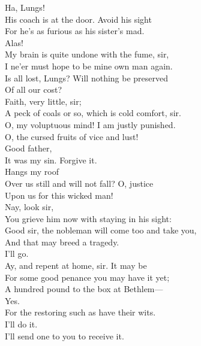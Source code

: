 \documentclass[a4paper,oneside,12pt]{memoir}
\begin{document}
\begin{drama*}
\mammonspeaks {} Ha, Lungs!\\
\facespeaks His coach is at the door. Avoid his sight\\
For he's as furious as his sister's mad.\\
\mammonspeaks Alas!\\
\facespeaks {} My brain is quite undone with the fume, sir,\\
I ne'er must hope to be mine own man again.\\
\mammonspeaks Is all lost, Lungs? Will nothing be preserved\\
Of all our cost?\\
\facespeaks {} Faith, very little, sir;\\
A peck of coals or so, which is cold comfort, sir.\\
\mammonspeaks O, my voluptuous mind! I am justly punished.\\
\subtlespeaks O, the cursed fruits of vice and lust!\\
\mammonspeaks {} Good father,\\
It was my sin. Forgive it.\\
\subtlespeaks {} Hangs my roof\\
Over us still and will not fall? O, justice\\
Upon us for this wicked man!\\
\facespeaks {} Nay, look sir,\\
You grieve him now with staying in his sight:\\
Good sir, the nobleman will come too and take you,\\
And that may breed a tragedy.\\
\mammonspeaks {} I'll go.\\
\facespeaks Ay, and repent at home, sir. It may be\\
For some good penance you may have it yet;\\
A hundred pound to the box at Bethlem---\\
\mammonspeaks Yes.\\
\facespeaks {} For the restoring such as have their wits.\\
\mammonspeaks I'll do it.\\
\facespeaks {} I'll send one to you to receive it.\\

\end{drama*}
\end{document}
